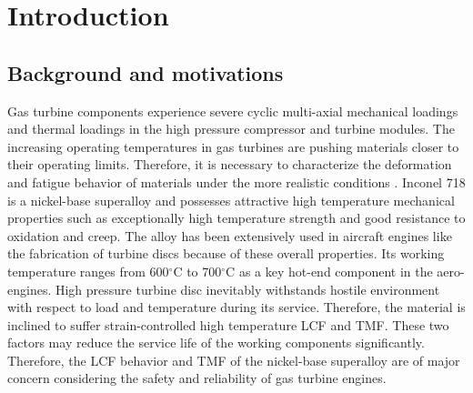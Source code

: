 \chapter{Introduction}

\section{Background and motivations}
\noindent
Gas turbine components experience severe cyclic multi-axial mechanical loadings and thermal loadings in the high pressure compressor and turbine modules.
The increasing operating temperatures in gas turbines are pushing materials closer to their operating limits.
Therefore, it is necessary to characterize the deformation and fatigue behavior of materials under the more realistic conditions \cite{harrison1996modelling}.
Inconel 718 is a nickel-base superalloy and possesses attractive high temperature mechanical properties such as exceptionally high temperature strength and good resistance to oxidation and creep.
The alloy has been extensively used in aircraft engines like the fabrication of turbine discs because of these overall properties. Its working temperature ranges from 600$^{\circ}$C to 700$^{\circ}$C as a key hot-end component in the aero-engines.
High pressure turbine disc inevitably withstands hostile environment with respect to load and temperature during its service. Therefore, the material is inclined to suffer strain-controlled high temperature LCF and TMF.
These two factors may reduce the service life of the working components significantly.
Therefore, the LCF behavior and TMF of the nickel-base superalloy are of major concern considering the safety and reliability of gas turbine engines.

